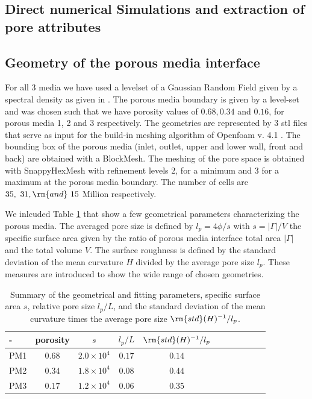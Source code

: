 \documentclass[draft,jgrga]{agutexSI2019}
\begin{document}
\begin{article}
\section{Direct numerical Simulations and extraction of pore attributes}

\subsection{Geometry of the porous media interface}
For all 3 media we have used a levelset of a Gaussian Random Field given by a spectral density as given in \cite{roberts_transport_1995}. The porous media boundary is given by a level-set and was chosen such that we have porosity values of $0.68,0.34$ and $0.16$, for porous media 1, 2 and 3 respectively. The geometries are represented by 3 stl files that serve as input for the build-in meshing algorithm of Openfoam v. 4.1 . The bounding box of the porous media (inlet, outlet, upper and lower wall, front and back) are obtained with a BlockMesh. The meshing of the pore space is obtained with SnappyHexMesh with refinement levels 2, for a minimum and 3 for a maximum at the porous media boundary. The number of cells are $35,~ 31,\rm{and }~15$ Million respectively.

We inlcuded Table \ref{tab:results_geometries} that show a few geometrical parameters characterizing the porous media. The averaged pore size is defined by $l_p = 4 \phi/s$ with $s= |\Gamma|/V$ the specific surface area given by the ratio of porous media interface total area $|\Gamma|$ and the total volume $V$. The surface roughness is defined by the standard deviation of the mean curvature $H$ divided by the average pore size $l_p$. These measures are introduced to show the wide range of chosen geometries. 

\begin{table}[htbp!]
\caption{Summary of the geometrical and fitting parameters, specific surface area $s$, relative pore size $l_p/L$, and the standard deviation of the mean curvature times the average pore size $\rm{std}(H)^{-1}/l_p$.}

\begin{tabular}{l|c|c|c|c|c|c|c|c|c|c}
- & porosity & $s$ & $ l_p/L$ &  $\rm{std}(H)^{-1}/l_p$ \\
\hline
PM1 &$0.68$ & $2.0\times10^{4}$ & $0.17$ &  $0.14$ \\
PM2 & $0.34$ & $1.8\times10^{4}$ & $0.08$ &  $0.44$ \\
PM3 & $0.17$ & $1.2\times10^{4}$ & $0.06$ &  $0.35$ 
\end{tabular}
\label{tab:results_geometries}
\end{table}



\end{article}
\end{document}
